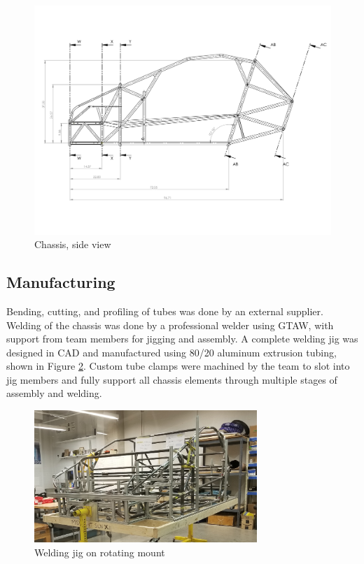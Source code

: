 \documentclass[10pt]{article}
\begin{document}
\begin{figure}
\centering
\includegraphics[width=\textwidth]{figures/chassis-side}
\caption{Chassis, side view}
\label{fig:chassis-side}
\end{figure}

\subsection{Manufacturing}
Bending, cutting, and profiling of tubes was done by an external supplier. Welding of the chassis was done by a professional welder using GTAW, with support from team members for jigging and assembly. A complete welding jig was designed in CAD and manufactured using 80/20 aluminum extrusion tubing, shown in Figure \ref{fig:welding-jig}. Custom tube clamps were machined by the team to slot into jig members and fully support all chassis elements through multiple stages of assembly and welding.

\begin{figure}
\centering
\includegraphics[width=0.75\textwidth]{figures/welding-jig}
\caption{Welding jig on rotating mount}
\label{fig:welding-jig}
\end{figure}
\end{document}
